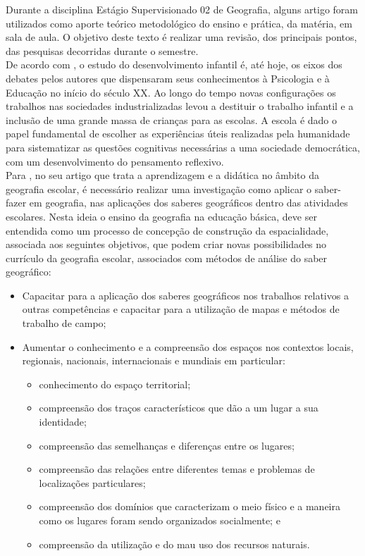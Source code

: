 Durante a disciplina Estágio Supervisionado 02 de Geografia, alguns artigo foram utilizados como aporte teórico metodológico do ensino e prática, da matéria, em sala de aula. O objetivo deste texto é realizar uma revisão, dos principais pontos, das pesquisas decorridas durante o semestre.\\

De acordo com \cite{de2002psicologia}, o estudo do desenvolvimento infantil é, até hoje, os eixos dos debates pelos autores que dispensaram  seus conhecimentos à Psicologia e à Educação no início do século XX. Ao longo do tempo novas configurações os trabalhos nas sociedades industrializadas levou a destituir o trabalho infantil e a inclusão de uma grande massa de crianças para as escolas. A escola é dado o papel fundamental de escolher as experiências úteis realizadas pela humanidade para sistematizar as  questões cognitivas necessárias a uma sociedade democrática, com um desenvolvimento do pensamento reflexivo.\\

Para \cite{castellar2005educaccao}, no seu artigo que trata a aprendizagem e a didática no âmbito da geografia escolar, é necessário realizar uma investigação como aplicar o saber-fazer em geografia, nas aplicações dos saberes geográficos dentro das atividades escolares. Nesta ideia o ensino da geografia na educação básica, deve ser entendida como um processo de concepção de construção da espacialidade, associada aos seguintes objetivos, que podem criar novas possibilidades no currículo da geografia escolar, associados com métodos de análise do saber geográfico:\\

\begin{itemize}
\item Capacitar para a aplicação dos saberes geográficos nos trabalhos relativos a  outras competências e capacitar para a utilização de mapas e métodos de trabalho de campo;
\item Aumentar o conhecimento e a compreensão  dos espaços nos contextos locais, regionais, nacionais, internacionais e mundiais em particular:
\begin{itemize}
\item conhecimento do espaço territorial;
\item compreensão dos traços característicos que dão a um lugar a sua identidade;
\item compreensão das semelhanças e diferenças entre os lugares;
\item compreensão das relações entre diferentes temas e problemas de localizações particulares;
\item compreensão dos domínios que caracterizam o meio físico e a maneira como os lugares foram sendo organizados socialmente; e
\item compreensão da utilização e do mau uso dos recursos naturais.
\end{itemize}
\end{itemize}

